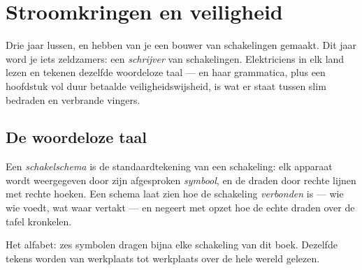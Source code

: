 \chapter{Stroomkringen en veiligheid}\label{ch:g6:circuits-and-safety}

Drie jaar lussen,  en  hebben van je een bouwer van
schakelingen gemaakt. Dit jaar word je iets zeldzamers: een
\emph{schrijver} van schakelingen. Elektriciens in elk land lezen en
tekenen dezelfde woordeloze taal --- en haar grammatica, plus een
hoofdstuk vol duur betaalde veiligheidswijsheid, is wat er staat tussen
slim bedraden en verbrande vingers.

\section{De woordeloze taal}

\begin{definition}[Schakelschema]\label{def:g6:circuits-and-safety:diagram}
Een \emph{schakelschema} is de standaardtekening
van een schakeling: elk apparaat wordt weergegeven door zijn
afgesproken \emph{symbool}, en de draden door rechte
lijnen met rechte hoeken. Een schema laat zien hoe de schakeling
\emph{verbonden} is --- wie wie voedt, wat waar vertakt --- en negeert
met opzet hoe de echte draden over de tafel kronkelen.
\end{definition}

\begin{omfigure}

{\small Het alfabet: zes symbolen dragen bijna elke schakeling van dit
boek. Dezelfde tekens worden van werkplaats tot werkplaats over de
hele wereld gelezen.}
\end{omfigure}

